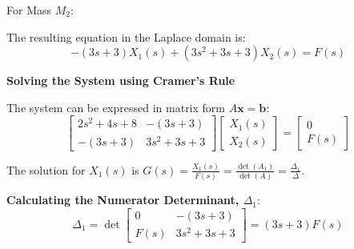 \documentclass[11pt]{article}
\begin{document}
\vspace{12pt}
{For Mass $M_2$:}
\begin{figure}[h!]
\centering
{}
\end{figure}

The resulting equation in the Laplace domain is:
\begin{equation}
-(3s + 3)X_1(s) + (3s^2 + 3s + 3)X_2(s) = F(s) \tag{2}
\end{equation}

\newpage
\noindent\textbf{Solving the System using Cramer's Rule}
\vspace{12pt}

The system can be expressed in matrix form $A\mathbf{x} = \mathbf{b}$:
$$
\begin{bmatrix}
2s^2 + 4s + 8 & -(3s + 3) \\
-(3s + 3) & 3s^2 + 3s + 3
\end{bmatrix}
\begin{bmatrix}
X_1(s) \\
X_2(s)
\end{bmatrix}
=
\begin{bmatrix}
0 \\
F(s)
\end{bmatrix}
$$

The solution for $X_1(s)$ is $G(s) = \frac{X_1(s)}{F(s)} = \frac{\det(A_1)}{\det(A)} = \frac{\Delta_1}{\Delta}$.

\vspace{12pt}
\noindent\textbf{Calculating the Numerator Determinant, $\Delta_1$}:
$$ \Delta_1 = \det
\begin{bmatrix}
0 & -(3s + 3) \\
F(s) & 3s^2 + 3s + 3
\end{bmatrix}
= (3s + 3)F(s) $$
\end{document}
